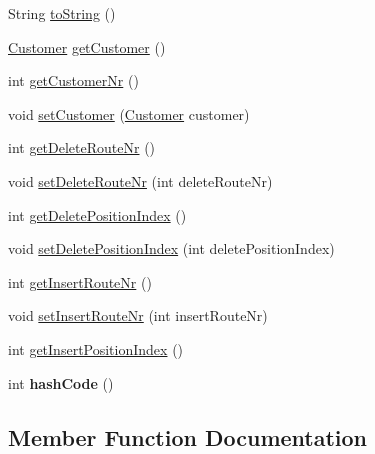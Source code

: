 \begin{DoxyCompactItemize}
\item 
String \hyperlink{classtabu_1_1_my_relocate_move_a6b1ded66f2b4d5de33ea3247116a006d}{to\+String} ()
\item 
\hyperlink{classsvrptw_1_1_customer}{Customer} \hyperlink{classtabu_1_1_my_relocate_move_aae57dd26b844720e791d7c6e0d1a7872}{get\+Customer} ()
\item 
int \hyperlink{classtabu_1_1_my_relocate_move_a611947d2c774dfd3b16ffc07337f47ed}{get\+Customer\+Nr} ()
\item 
void \hyperlink{classtabu_1_1_my_relocate_move_ac6556d357326f4238e24d4d6ff9afb6e}{set\+Customer} (\hyperlink{classsvrptw_1_1_customer}{Customer} customer)
\item 
int \hyperlink{classtabu_1_1_my_relocate_move_aa3c27b46ec418cf6dabca99e5fda0e45}{get\+Delete\+Route\+Nr} ()
\item 
void \hyperlink{classtabu_1_1_my_relocate_move_a10fccca938aeae163de9f6a4e1372373}{set\+Delete\+Route\+Nr} (int delete\+Route\+Nr)
\item 
int \hyperlink{classtabu_1_1_my_relocate_move_afd793fd589faef3f6536718bc7de485a}{get\+Delete\+Position\+Index} ()
\item 
void \hyperlink{classtabu_1_1_my_relocate_move_af65ea518dd26a706caa8b37c4e5bd028}{set\+Delete\+Position\+Index} (int delete\+Position\+Index)
\item 
int \hyperlink{classtabu_1_1_my_relocate_move_aee42f2d3d094c960d2d8e7f90139f5ff}{get\+Insert\+Route\+Nr} ()
\item 
void \hyperlink{classtabu_1_1_my_relocate_move_add15dfab24de3777fb891e5736f8b96b}{set\+Insert\+Route\+Nr} (int insert\+Route\+Nr)
\item 
int \hyperlink{classtabu_1_1_my_relocate_move_a2ac1e85e494fde9ba9560533909ddeb1}{get\+Insert\+Position\+Index} ()
\item 
int {\bfseries hash\+Code} ()\hypertarget{classtabu_1_1_my_relocate_move_a1b9b6dd480dc5d8e59216a42ecb33f56}{}\label{classtabu_1_1_my_relocate_move_a1b9b6dd480dc5d8e59216a42ecb33f56}

\end{DoxyCompactItemize}


\subsection{Member Function Documentation}
